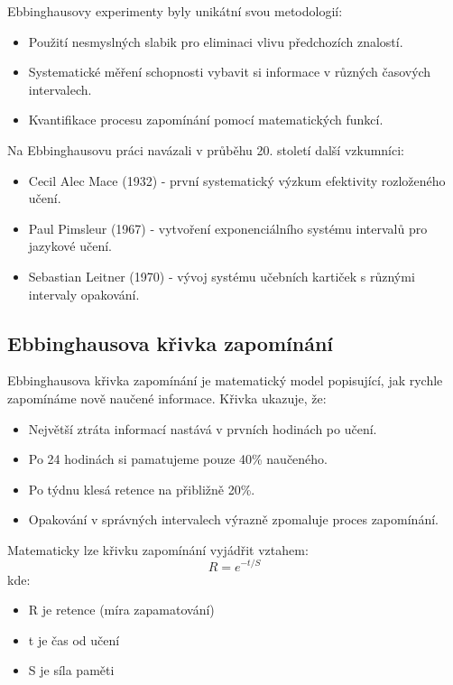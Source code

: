 \documentclass[12pt, a4paper, oneside]{report}
\begin{document}
	Ebbinghausovy experimenty byly unikátní svou metodologií:
	\begin{itemize}
		\item Použití nesmyslných slabik pro eliminaci vlivu předchozích znalostí.
		\item Systematické měření schopnosti vybavit si informace v různých časových intervalech.
		\item Kvantifikace procesu zapomínání pomocí matematických funkcí.
	\end{itemize}

	Na Ebbinghausovu práci navázali v průběhu 20. století další vzkumníci:
	\begin{itemize}
		\item Cecil Alec Mace (1932) - první systematický výzkum efektivity rozloženého učení.
		\item Paul Pimsleur (1967) - vytvoření exponenciálního systému intervalů pro jazykové učení.
		\item Sebastian Leitner (1970) - vývoj systému učebních kartiček s různými intervaly opakování.
	\end{itemize}

	\subsection{Ebbinghausova křivka zapomínání}
	Ebbinghausova křivka zapomínání je matematický model popisující, jak rychle zapomínáme nově naučené informace. Křivka ukazuje, že:
	\begin{itemize}
		\item Největší ztráta informací nastává v prvních hodinách po učení.
		\item Po 24 hodinách si pamatujeme pouze 40\% naučeného.
		\item Po týdnu klesá retence na přibližně 20\%.
		\item Opakování v správných intervalech výrazně zpomaluje proces zapomínání.
	\end{itemize}

	Matematicky lze křivku zapomínání vyjádřit vztahem:
	\begin{equation}
		R = e^{-t/S}
	\end{equation}
	kde:
	\begin{itemize}
		\item R je retence (míra zapamatování)
		\item t je čas od učení
		\item S je síla paměti
	\end{itemize}
\end{document}
